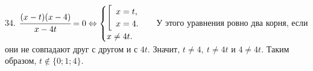 34. $\cfrac{(x-t)(x-4)}{x-4t}=0\Leftrightarrow\begin{cases}\left[\begin{array}{l}x=t,\\ x=4.\end{array}\right.\\x\neq4t.\end{cases}$ У этого уравнения ровно два корня, если они не совпадают друг с другом и с $4t.$ Значит, $t\neq4,\ t\neq4t$ и $4\neq4t.$ Таким образом, $t\notin\{0; 1; 4\}.$\\
